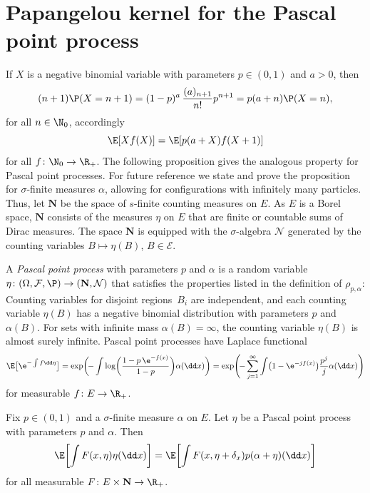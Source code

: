 \section{Papangelou kernel for the Pascal point process} \label{sec:pascal}


If $X$ is a negative binomial variable with parameters $p\in (0,1)$ and $a>0$, then
\[
 (n+1)\P( X = n+1) = (1-p)^a\, \frac{(a)_{n+1}}{n!} p^{n+1} = p (a+n)\P( X = n),
\]
for all $n\in \N_0$, accordingly
\[
	\E[ X f(X)] = \E[ p(a+X) f(X+1)]
\]
for all $f\colon \N_0\to \R_+$. The following proposition gives the analogous property for Pascal point processes. For future reference we state and prove the proposition for $\sigma$-finite measures $\alpha$, allowing for configurations with infinitely many particles. Thus, let $\mathbf N$ be the space of $s$-finite counting measures on $E$. As $E$ is a Borel space, $\mathbf N$ consists of the measures $\eta$ on $E$ that are finite or countable sums of Dirac measures. The space $\mathbf N$ is equipped with the $\sigma$-algebra $\mathcal N$ generated by the counting variables $B\mapsto \eta(B)$, $B\in \mathcal E$.

A \emph{Pascal point process} with parameters $p$ and $\alpha$ is a random variable $\eta\colon(\Omega,\mathcal F, \P)\to (\mathbf N,\mathcal N)$ that satisfies the properties listed in the definition of $\rho_{p,\alpha}$: Counting variables for disjoint regions~$B_i$ are independent, and each counting variable $\eta(B)$ has a negative binomial distribution with parameters $p$ and $\alpha(B)$. For sets with infinite mass $\alpha(B) = \infty$, the counting variable $\eta(B)$ is almost surely infinite. Pascal point processes have Laplace functional
\begin{gather*}
	\E\bigl[ \e^{-\int f\dd \eta}\bigr] = \exp \biggl(\! - \int \log \biggl(\frac{1- p\,\e^{-f(x)}}{1- p}\biggr) \alpha (\dd x)\biggr) = 	\exp\Biggl(\! - \sum_{j=1}^\infty \int \bigl(1- \e^{- j f(x)}\bigr) \frac{p^j}{j} \alpha(\dd x) \Biggr)
\end{gather*}
for measurable $f \colon E \to \R_+$.

\begin{Proposition}%
	Fix $p\in (0,1)$ and a $\sigma$-finite measure $\alpha$ on $E$. Let $\eta$ be a Pascal point process with parameters $p$ and $\alpha$. Then
	\[
		\E\biggl[ \int F(x,\eta)\eta(\dd x)\biggr] = \E\biggl[\int F(x,\eta+\delta_x) p (\alpha+\eta)(\dd x)\biggr]
	\]
	for all measurable $F\colon E\times \mathbf N \to \R_+$.
\end{Proposition}

